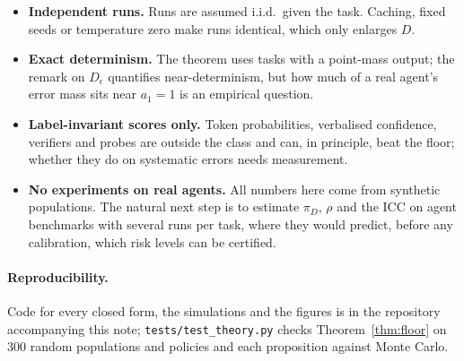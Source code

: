 \documentclass[11pt]{article}
\theoremstyle{definition}
\begin{document}
\begin{itemize}[leftmargin=*,itemsep=2pt]
\item \textbf{Independent runs.} Runs are assumed i.i.d.\ given the task. Caching, fixed seeds or
temperature zero make runs identical, which only enlarges $D$.
\item \textbf{Exact determinism.} The theorem uses tasks with a point-mass output; the remark on
$D_\epsilon$ quantifies near-determinism, but how much of a real agent's error mass sits near
$a_1=1$ is an empirical question.
\item \textbf{Label-invariant scores only.} Token probabilities, verbalised confidence, verifiers
and probes are outside the class and can, in principle, beat the floor; whether they do on
systematic errors needs measurement.
\item \textbf{No experiments on real agents.} All numbers here come from synthetic populations.
The natural next step is to estimate $\pi_D$, $\rho$ and the ICC on agent benchmarks with several
runs per task, where they would predict, before any calibration, which risk levels can be
certified.
\end{itemize}

\paragraph{Reproducibility.} Code for every closed form, the simulations and the figures is in
the repository accompanying this note; \texttt{tests/test\_theory.py} checks
Theorem~\ref{thm:floor} on 300 random populations and policies and each proposition against Monte
Carlo.

\renewcommand{\bibfont}{\small}
\setlength{\bibsep}{3pt}


\end{document}
